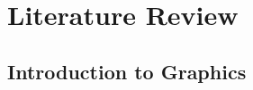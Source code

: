 \documentclass[print]{nuthesis}
\begin{document}


\tableofcontents

\listoffigures
\listoftables

\mainmatter


\hypertarget{literature-review}{%
\chapter{Literature Review}\label{literature-review}}

\hypertarget{introduction-to-graphics}{%
\section{Introduction to Graphics}\label{introduction-to-graphics}}
\end{document}
